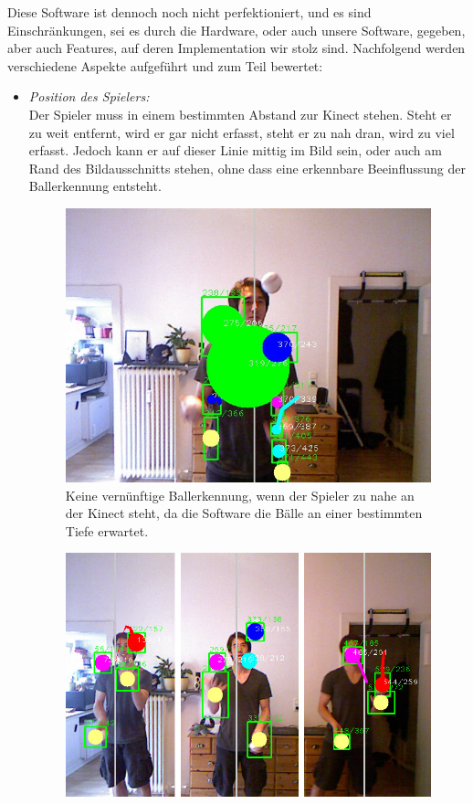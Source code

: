 \documentclass[12pt,a4paper,ngerman]{scrartcl}
\begin{document}
Diese Software ist dennoch noch nicht perfektioniert, und es sind Einschränkungen, sei es durch die Hardware, oder auch unsere Software, gegeben, aber auch Features, auf deren Implementation wir stolz sind. Nachfolgend werden verschiedene Aspekte aufgeführt und zum Teil bewertet:

\begin{itemize}
\item {\em Position des Spielers:}\\
Der Spieler muss in einem bestimmten Abstand zur Kinect stehen. Steht er zu weit entfernt, wird er gar nicht erfasst, steht er zu nah dran, wird zu viel erfasst. Jedoch kann er auf dieser Linie mittig im Bild sein, oder auch am Rand des Bildausschnitts stehen, ohne dass eine erkennbare Beeinflussung der Ballerkennung entsteht.
\begin{figure}[H]
    \centering
    \includegraphics[scale=0.5]{img/bewertung_nahe.jpg}
    \caption{Keine vernünftige Ballerkennung, wenn der Spieler zu nahe an der Kinect steht, da die Software die Bälle an einer bestimmten Tiefe erwartet.}
\end{figure}
\begin{figure}[H]
    \centering
    \includegraphics[scale=0.5]{img/bewertung_rand.jpg}

\end{figure}
\end{itemize}
\end{document}
